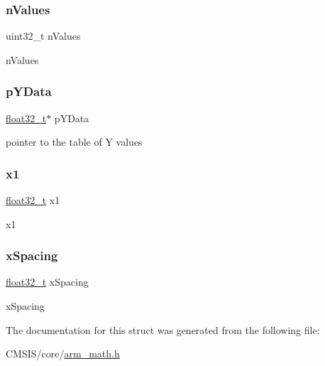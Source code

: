 \subsubsection{\texorpdfstring{nValues}{nValues}}
{\footnotesize\ttfamily uint32\+\_\+t n\+Values}

n\+Values \mbox{\label{structarm__linear__interp__instance__f32_af1489866b69eb5db1e0afeb24c7b01e9}} 
\subsubsection{\texorpdfstring{pYData}{pYData}}
{\footnotesize\ttfamily \mbox{\hyperlink{arm__math_8h_a4611b605e45ab401f02cab15c5e38715}{float32\+\_\+t}}$\ast$ p\+Y\+Data}

pointer to the table of Y values \mbox{\label{structarm__linear__interp__instance__f32_a795ed79ea4c18d52afe5eb5e868e1c5a}} 
\subsubsection{\texorpdfstring{x1}{x1}}
{\footnotesize\ttfamily \mbox{\hyperlink{arm__math_8h_a4611b605e45ab401f02cab15c5e38715}{float32\+\_\+t}} x1}

x1 \mbox{\label{structarm__linear__interp__instance__f32_a08675584bb57fc42bbb3739c13674346}} 
\subsubsection{\texorpdfstring{xSpacing}{xSpacing}}
{\footnotesize\ttfamily \mbox{\hyperlink{arm__math_8h_a4611b605e45ab401f02cab15c5e38715}{float32\+\_\+t}} x\+Spacing}

x\+Spacing 

The documentation for this struct was generated from the following file\+:\begin{DoxyCompactItemize}
\item 
C\+M\+S\+I\+S/core/\mbox{\hyperlink{arm__math_8h}{arm\+\_\+math.\+h}}\end{DoxyCompactItemize}
